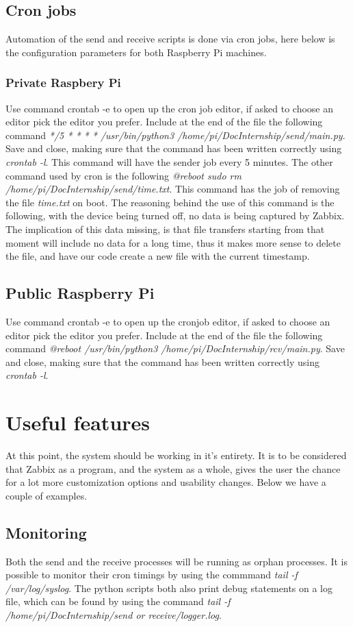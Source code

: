 \documentclass[a4paper,11pt]{scrartcl}
\begin{document}
\subsection{Cron jobs}
Automation of the send and receive scripts is done via cron jobs, here below is the configuration parameters for both Raspberry Pi machines.
\subsubsection{Private Raspbery Pi}
Use command crontab -e to open up the cron job editor, if asked to choose an editor pick the editor you prefer. Include at the end of the file the following command \textit{*/5 * * * *  /usr/bin/python3 /home/pi/DocInternship/send/main.py}. Save and close, making sure that the command has been written correctly using \textit{crontab -l}. This command will have the sender job every 5 minutes. The other command used by cron is the following \textit{@reboot  sudo rm /home/pi/DocInternship/send/time.txt}. This command has the job of removing the file \textit{time.txt} on boot. The reasoning behind the use of this command is the following, with the device being turned off, no data is being captured by Zabbix. The implication of this data missing, is that file transfers starting from that moment will include no data for a long time, thus it makes more sense to delete the file, and have our code create a new file with the current timestamp.

\subsection{Public Raspberry Pi}
Use command crontab -e to open up the cronjob editor, if asked to choose an editor pick the editor you prefer. Include at the end of the file the following command \textit{@reboot  /usr/bin/python3 /home/pi/DocInternship/rcv/main.py}. Save and close, making sure that the command has been written correctly using \textit{crontab -l}.

\section{Useful features}
At this point, the system should be working in it's entirety. It is to be considered that Zabbix as a program, and the system as a whole, gives the user the chance for a lot more customization options and usability changes. Below we have a couple of examples.

\subsection{Monitoring}
Both the send and the receive processes will be running as orphan processes. It is possible to monitor their cron timings by using the commmand \textit{tail -f /var/log/syslog}. The python scripts both also print debug statements on a log file, which can be found by using the command \textit{tail -f /home/pi/DocInternship/send or receive/logger.log}. 
\end{document}
